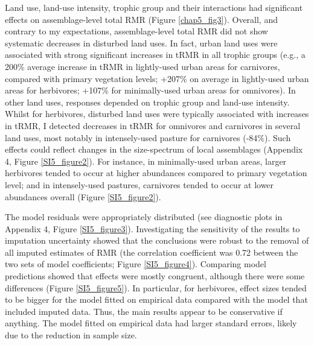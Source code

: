 Land use, land-use intensity, trophic group and their interactions had significant effects on assemblage-level total RMR (Figure \ref{chap5_fig3}). Overall, and contrary to my expectations, assemblage-level total RMR did not show systematic decreases in disturbed land uses. In fact, urban land uses were associated with strong significant increases in tRMR in all trophic groups (e.g., a 200\% average increase in tRMR in lightly-used urban areas for carnivores, compared with primary vegetation levels; +207\% on average in lightly-used urban areas for herbivores; +107\% for minimally-used urban areas for omnivores). In other land uses, responses depended on trophic group and land-use intensity. Whilst for herbivores, disturbed land uses were typically associated with increases in tRMR, I detected decreases in tRMR for omnivores and carnivores in several land uses, most notably in intensely-used pasture for carnivores (-84\%). Such effects could reflect changes in the size-spectrum of local assemblages (Appendix 4, Figure \ref{SI5_figure2}). For instance, in minimally-used urban areas, larger herbivores tended to occur at higher abundances compared to primary vegetation level; and in intensely-used pastures, carnivores tended to occur at lower abundances overall (Figure \ref{SI5_figure2}).

\vspace{0.5cm}
The model residuals were appropriately distributed (see diagnostic plots in Appendix 4, Figure \ref{SI5_figure3}). Investigating the sensitivity of the results to imputation uncertainty showed that the conclusions were robust to the removal of all imputed estimates of RMR (the correlation coefficient was 0.72 between the two sets of model coefficients; Figure \ref{SI5_figure4}). Comparing model predictions showed that effects were mostly congruent, although there were some differences (Figure \ref{SI5_figure5}). In particular, for herbivores, effect sizes tended to be bigger for the model fitted on empirical data compared with the model that included imputed data. Thus, the main results appear to be conservative if anything. The model fitted on empirical data had larger standard errors, likely due to the reduction in sample size. 


